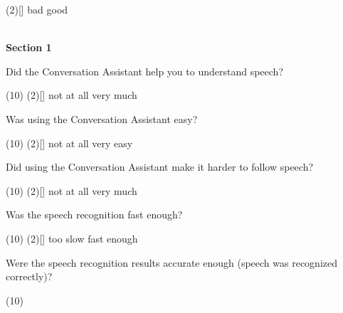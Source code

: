 \documentclass[english, 12pt, a4paper, pdftex, elec, utf8]{aaltothesis}
\begin{document}
{\begin{questionnaire}
\begin{tasks}[]
            \task*(2)[] bad
            \task[] good \\\\
        \end{tasks}
    \end{questionnaire}
    \noindent
    \hspace{0.35cm} \textbf{Section 1}
    \begin{questionnaire}[resume]
        \item Did the Conversation Assistant help you to understand speech?
        \begin{tasks}[](10)
            \task*(2)[] not at all
            \task[] very much
        \end{tasks}
        \item Was using the Conversation Assistant easy?
        \begin{tasks}[](10)
            \task*(2)[] not at all
            \task[] very easy
        \end{tasks}
        \item Did using the Conversation Assistant make it harder to follow speech?
        \begin{tasks}[](10)
            \task*(2)[] not at all
            \task[] very much
        \end{tasks}
        \item Was the speech recognition fast enough?
        \begin{tasks}[](10)
            \task*(2)[] too slow
            \task[] fast enough
        \end{tasks}
        \item Were the speech recognition results accurate enough (speech was recognized correctly)?
        \begin{tasks}[](10)

\end{tasks}
\end{questionnaire}}
\end{document}
